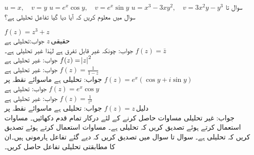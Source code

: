 \quad
$u=x,\quad v=y$
\quad
$u=e^x\cos y,\quad v=e^x\sin y$
\quad
$u=x^3-3xy^2,\quad v=3x^2y-y^3$
سوال  تا سوال  میں معلوم کریں کہ آیا دیا گیا تفاعل تحلیلی ہے؟

\quad
$f(z)=z^3+z$\\
جواب:\quad تحلیلی ہے
\quad
$z\,\text{حقیقی}$\\
جواب:\quad
چونکہ غیر قابل تفرق ہے لہٰذا غیر تحلیلی ہے۔
\quad
$f(z)=\bar{z}$\\
جواب:\quad
غیر تحلیلی ہے
\quad
$f(z)=\abs{z}^2$\\
جواب:\quad
غیر تحلیلی ہے
\quad
$f(z)=\tfrac{1}{1-z}$\\
جواب:\quad
تحلیلی ہے ماسوائے نقطہ  پر
\quad
$f(z)=e^x(\cos y+i\sin y)$\\
جواب:\quad
تحلیلی ہے
\quad
$f(z)=e^x\cos y$\\
جواب:\quad
غیر تحلیلی ہے
\quad
$f(z)=\tfrac{1}{z^2}$\\
جواب:\quad
تحلیلی ہے ماسوائے نقطہ  پر
\quad
$f(z)=z\,\text{دلیل}$\\
جواب:\quad
غیر تحلیلی
\quad
مساوات  حاصل کرنے کے لئے درکار تمام قدم دکھائیں۔
\quad
مساوات  استعمال کرتے ہوئے تصدیق کریں کہ  تحلیلی ہے۔
\quad
مساوات  استعمال کرتے ہوئے تصدیق کریں کہ  تحلیلی ہے۔
سوال  تا سوال  میں تصدیق کریں کہ دیے گئے تفاعل ہارمونی ہیں۔ان کا مطابقتی تحلیلی تفاعل  حاصل کریں۔

